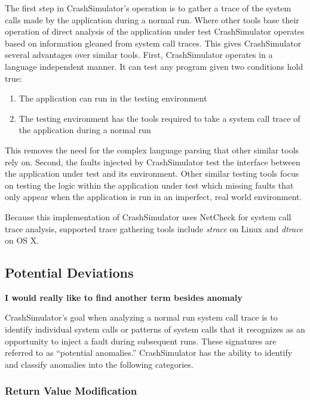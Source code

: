         The first step in CrashSimulator's operation is to gather a trace of the system calls made by the application
        during a normal run. Where other tools base their operation of direct analysis of the application under test
        CrashSimulator operates based on information gleaned from system call traces. This gives CrashSimulator several
        advantages over similar tools. First, CrashSimulator operates in a language independent manner. It can test any
        program given two conditions hold true:

        \begin{enumerate}
            \item{The application can run in the testing environment}
            \item{The testing environment has the tools required to take a system call trace of the application during
            a normal run}
        \end{enumerate}

        This removes the need for the complex language parsing that other similar tools rely on. Second, the faults
        injected by CrashSimulator test the interface between the application under test and its environment. Other
        similar testing tools focus on testing the logic within the application under test which missing faults that
        only appear when the application is run in an imperfect, real world environment.

        Because this implementation of CrashSimulator uses NetCheck for system call trace analysis, supported trace
        gathering tools include \emph{strace} on Linux and \emph{dtrace} on OS X.

    \subsection{Potential Deviations}

        \textbf{I would really like to find another term besides anomaly}

        CrashSimulator's goal when analyzing a normal run system call trace is to identify individual system calls or
        patterns of system calls that it recognizes as an opportunity to inject a fault during subsequent runs. These
        signatures are referred to as ``potential anomalies.'' CrashSimulator has the ability to identify and classify
        anomalies into the following categories.

        \subsubsection{Return Value Modification}

